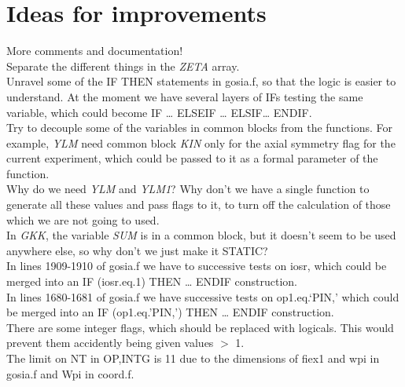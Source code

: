 \chapter{Ideas for improvements}

More comments and documentation!\\

Separate the different things in the {\em ZETA} array.\\

Unravel some of the IF THEN statements in gosia.f, so that the logic is
easier to understand. At the moment we have several layers of IFs testing
the same variable, which could become IF {\ldots} ELSEIF {\ldots}
ELSIF{\ldots} ENDIF.\\

Try to decouple some of the variables in common blocks from the functions.
For example, {\em YLM} need common block {\em KIN} only for the axial
symmetry flag for the current experiment, which could be passed to it as a
formal parameter of the function.\\

Why do we need {\em YLM} and {\em YLM1}? Why don't we have a single function
to generate all these values and pass flags to it, to turn off the
calculation of those which we are not going to used.\\

In {\em GKK}, the variable {\em SUM} is in a common block, but it doesn't
seem to be used anywhere else, so why don't we just make it STATIC?\\

In lines 1909-1910 of gosia.f we have to successive tests on iosr, which
could be merged into an IF (iosr.eq.1) THEN {\ldots} ENDIF construction.\\

In lines 1680-1681 of gosia.f we have successive tests on op1.eq.`PIN,'
which could be merged into an IF (op1.eq.'PIN,') THEN {\ldots} ENDIF
construction.\\

There are some integer flags, which should be replaced with logicals. This
would prevent them accidently being given values $>$ 1.\\

The limit on NT in OP,INTG is 11 due to the dimensions of fiex1 and wpi in
gosia.f and Wpi in coord.f.\\

